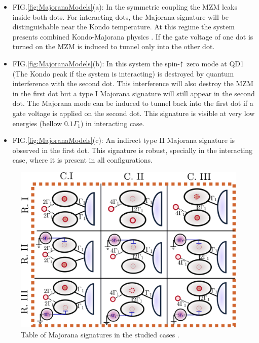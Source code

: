 \begin{itemize}
    \item[]FIG.\ref{fig:MajoranaModels}(a): In the symmetric coupling the MZM leaks inside both dots. For interacting dots, the Majorana signature will be distinguishable near the Kondo temperature. At this regime the system presents combined Kondo-Majorana physics . If the gate voltage of one dot is turned on the MZM is induced to tunnel only into the other dot.  
    \item[]FIG.\ref{fig:MajoranaModels}(b): In this system the spin-$\uparrow$ zero mode at QD1 (The Kondo peak if the system is interacting) is destroyed by quantum interference with the second dot. This interference will also destroy the MZM in the first dot but a type I Majorana signature will still appear in the second dot. The Majorana mode can be induced to tunnel back into the first dot if a gate voltage is applied on the second dot. This signature is visible at very low energies (bellow $0.1\Gamma_1$) in interacting case. 
    \item[]FIG.\ref{fig:MajoranaModels}(c): An indirect type II Majorana signature is observed in the first dot. This signature is robust, specially in the interacting case, where it is present in all configurations. 

\end{itemize}

    
    \begin{figure}
        \begin{center}{}
        \includegraphics[scale=0.25]{IMAGES/Graphs/Majorana_Old_Models.png}
        \caption{  \label{fig:ResultModels} Table of Majorana signatures in the studied cases .
        }
        \end{center}
    \end{figure}






